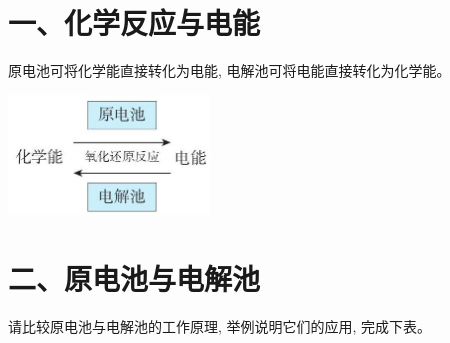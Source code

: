 \documentclass[10pt]{article}
\begin{document}
\section*{一、化学反应与电能}

原电池可将化学能直接转化为电能, 电解池可将电能直接转化为化学能。

\begin{center}
\includegraphics[max width=0.4\textwidth]{images/0190da9d-8bfd-732f-bc2c-0b21d0f13b91_123_231785.jpg}
\end{center}

\section*{二、原电池与电解池}

请比较原电池与电解池的工作原理, 举例说明它们的应用, 完成下表。
\end{document}
